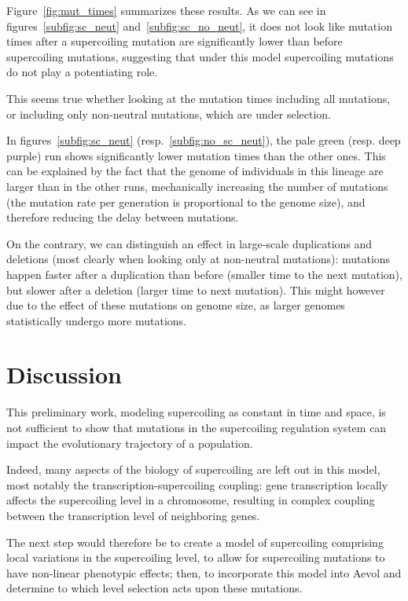 Figure~\ref{fig:mut_times} summarizes these results.
As we can see in figures~\ref{subfig:sc_neut} and~\ref{subfig:sc_no_neut}, it does not look like mutation times after a supercoiling mutation are significantly lower than before supercoiling mutations, suggesting that under this model supercoiling mutations do not play a potentiating role.

This seems true whether looking at the mutation times including all mutations, or including only non-neutral mutations, which are under selection.

In figures~\ref{subfig:sc_neut} (resp.~\ref{subfig:no_sc_neut}), the pale green (resp. deep purple) run shows significantly lower mutation times than the other ones.
This can be explained by the fact that the genome of individuals in this lineage are larger than in the other runs, mechanically increasing the number of mutations (the mutation rate per generation is proportional to the genome size), and therefore reducing the delay between mutations.

On the contrary, we can distinguish an effect in large-scale duplications and deletions (most clearly when looking only at non-neutral mutations): mutations happen faster after a duplication than before (smaller time to the next mutation), but slower after a deletion (larger time to next mutation).
This might however due to the effect of these mutations on genome size, as larger genomes statistically undergo more mutations.

\section{Discussion}

This preliminary work, modeling supercoiling as constant in time and space, is not sufficient to show that mutations in the supercoiling regulation system can impact the evolutionary trajectory of a population.

Indeed, many aspects of the biology of supercoiling are left out in this model, most notably the transcription-supercoiling coupling: gene transcription locally affects the supercoiling level in a chromosome, resulting in complex coupling between the transcription level of neighboring genes.

The next step would therefore be to create a model of supercoiling comprising local variations in the supercoiling level, to allow for supercoiling mutations to have non-linear phenotypic effects; then, to incorporate this model into Aevol and determine to which level selection acts upon these mutations.
